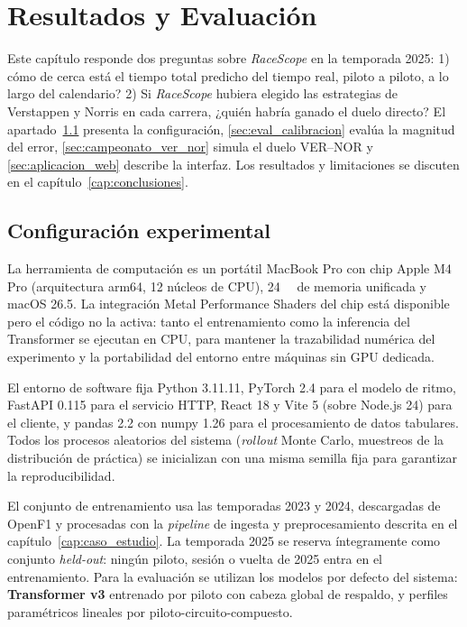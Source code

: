 
\chapter{Resultados y Evaluación}
\label{cap:resultados}

Este capítulo responde dos preguntas sobre \textit{RaceScope} en la temporada 2025: 1) cómo de cerca está el tiempo total predicho del tiempo real, piloto a piloto, a lo largo del calendario? 2) Si \textit{RaceScope} hubiera elegido las estrategias de Verstappen y Norris en cada carrera, ¿quién habría ganado el duelo directo? El apartado~\ref{sec:config_experimental} presenta la configuración, \ref{sec:eval_calibracion} evalúa la magnitud del error, \ref{sec:campeonato_ver_nor} simula el duelo VER–NOR y \ref{sec:aplicacion_web} describe la interfaz. Los resultados y limitaciones se discuten en el capítulo~\ref{cap:conclusiones}.

\section{Configuración experimental}
\label{sec:config_experimental}

La herramienta de computación es un portátil MacBook Pro con chip Apple M4 Pro (arquitectura arm64, 12 núcleos de CPU), \SI{24}{\giga\byte} de memoria unificada y macOS 26.5. La integración Metal Performance Shaders \cite{applemps} del chip está disponible pero el código no la activa: tanto el entrenamiento como la inferencia del Transformer se ejecutan en CPU, para mantener la trazabilidad numérica del experimento y la portabilidad del entorno entre máquinas sin GPU dedicada. 

El entorno de software fija Python 3.11.11, PyTorch 2.4 para el modelo de ritmo, FastAPI 0.115 para el servicio HTTP, React 18 y Vite 5 (sobre Node.js 24) para el cliente, y pandas 2.2 con numpy 1.26 para el procesamiento de datos tabulares. Todos los procesos aleatorios del sistema (\textit{rollout} Monte Carlo, muestreos de la distribución de práctica) se inicializan con una misma semilla fija para garantizar la reproducibilidad.

El conjunto de entrenamiento usa las temporadas 2023 y 2024, descargadas de OpenF1 y procesadas con la \textit{pipeline} de ingesta y preprocesamiento descrita en el capítulo~\ref{cap:caso_estudio}. La temporada 2025 se reserva íntegramente como conjunto \textit{held-out}: ningún piloto, sesión o vuelta de 2025 entra en el entrenamiento. Para la evaluación se utilizan los modelos por defecto del sistema: \textbf{Transformer v3} entrenado por piloto con cabeza global de respaldo, y perfiles paramétricos lineales por piloto-circuito-compuesto.


